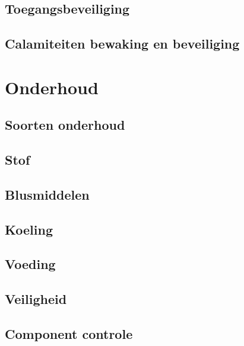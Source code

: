 \documentclass[a4paper,12pt,twoside,openright,titlepage]{book}
\begin{document}
\section{Toegangsbeveiliging}

\section{Calamiteiten bewaking en beveiliging}



\chapter{Onderhoud}

\section{Soorten onderhoud}

\section{Stof}

\section{Blusmiddelen}

\section{Koeling}

\section{Voeding}

\section{Veiligheid}

\section{Component controle}



\printindex
\end{document}
